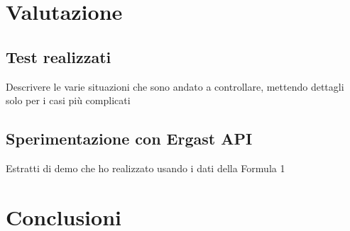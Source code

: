 \documentclass[12pt,a4paper,openright,twoside]{book}
\begin{document}
\chapter{Valutazione}

\section{Test realizzati}
Descrivere le varie situazioni che sono andato a controllare,
mettendo dettagli solo per i casi più complicati

\section{Sperimentazione con Ergast API}
Estratti di demo che ho realizzato usando i dati della Formula 1
\chapter{Conclusioni}





%
%
%





\end{document}
